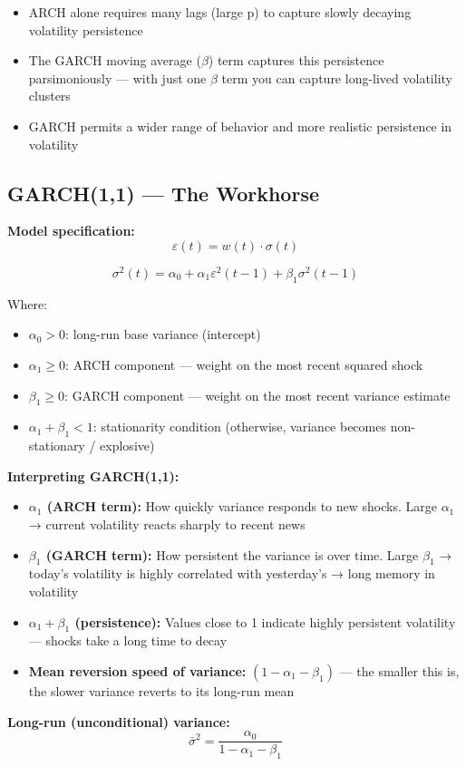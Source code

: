 \documentclass[12pt,openany]{book}
\theoremstyle{definition}
\theoremstyle{remark}
\begin{document}
\begin{itemize}
\item ARCH alone requires many lags (large p) to capture slowly decaying volatility persistence


\item The GARCH moving average (\(\beta\)) term captures this persistence parsimoniously --- with just one \(\beta\) term you can capture long-lived volatility clusters


\item GARCH permits a wider range of behavior and more realistic persistence in volatility


\end{itemize}
\medskip
\subsection{GARCH(1,1) --- The Workhorse}
\textbf{Model specification:} \[
\varepsilon(t) = w(t) \cdot \sigma(t)
\]

\[
\boxed{\sigma^2(t) = \alpha_0 + \alpha_1 \varepsilon^2(t-1) + \beta_1 \sigma^2(t-1)}
\]

Where:

\begin{itemize}
\item $\alpha_0 > 0$: long-run base variance (intercept)


\item $\alpha_1 \geq 0$: ARCH component --- weight on the most recent squared shock


\item $\beta_1 \geq 0$: GARCH component --- weight on the most recent variance estimate


\item $\alpha_1 + \beta_1 < 1$: stationarity condition (otherwise, variance becomes non-stationary / explosive)


\end{itemize}
\textbf{Interpreting GARCH(1,1):}

\begin{itemize}
\item \textbf{$\alpha_1$ (ARCH term):} How quickly variance responds to new shocks. Large $\alpha_1$ → current volatility reacts sharply to recent news


\item \textbf{$\beta_1$ (GARCH term):} How persistent the variance is over time. Large $\beta_1$ → today's volatility is highly correlated with yesterday's → long memory in volatility


\item \textbf{$\alpha_1 + \beta_1$ (persistence):} Values close to 1 indicate highly persistent volatility --- shocks take a long time to decay


\item \textbf{Mean reversion speed of variance:} $(1 - \alpha_1 - \beta_1)$ --- the smaller this is, the slower variance reverts to its long-run mean


\end{itemize}
\textbf{Long-run (unconditional) variance:} \[
\bar{\sigma}^2 = \frac{\alpha_0}{1 - \alpha_1 - \beta_1}
\]
\end{document}
